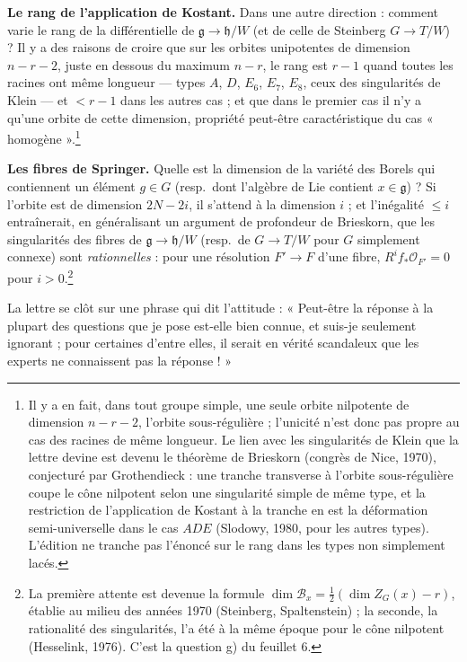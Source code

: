 \documentclass[11pt,a4paper]{article}
\begin{document}
\textbf{Le rang de l'application de Kostant.} Dans une autre direction : comment
varie le rang de la différentielle de $\mathfrak{g}\to\mathfrak{h}/W$ (et de
celle de Steinberg $G\to T/W$) ? Il y a des raisons de croire que sur les
orbites unipotentes de dimension $n-r-2$, juste en dessous du maximum $n-r$, le
rang est $r-1$ quand toutes les racines ont même longueur — types $A$, $D$,
$E_{6}$, $E_{7}$, $E_{8}$, ceux des singularités de Klein — et $<r-1$ dans les
autres cas ; et que dans le premier cas il n'y a qu'une orbite de cette
dimension, propriété peut-être caractéristique du cas « homogène ».\footnote{Il
y a en fait, dans tout groupe simple, une seule orbite nilpotente de dimension
$n-r-2$, l'orbite sous-régulière ; l'unicité n'est donc pas propre au cas des
racines de même longueur. Le lien avec les singularités de Klein que la lettre
devine est devenu le théorème de Brieskorn (congrès de Nice, 1970), conjecturé
par Grothendieck : une tranche transverse à l'orbite sous-régulière coupe le
cône nilpotent selon une singularité simple de même type, et la restriction de
l'application de Kostant à la tranche en est la déformation semi-universelle
dans le cas $ADE$ (Slodowy, 1980, pour les autres types). L'édition ne tranche
pas l'énoncé sur le rang dans les types non simplement lacés.}

\textbf{Les fibres de Springer.} Quelle est la dimension de la variété des
Borels qui contiennent un élément $g\in G$ (resp.\ dont l'algèbre de Lie
contient $x\in\mathfrak{g}$) ? Si l'orbite est de dimension $2N-2i$, il
s'attend à la dimension $i$ ; et l'inégalité $\leqslant i$ entraînerait, en
généralisant un argument de profondeur de Brieskorn, que les singularités des
fibres de $\mathfrak{g}\to\mathfrak{h}/W$ (resp.\ de $G\to T/W$ pour $G$
simplement connexe) sont \emph{rationnelles} : pour une résolution $F'\to F$
d'une fibre, $R^{i}f_{*}\mathcal{O}_{F'}=0$ pour $i>0$.\footnote{La première
attente est devenue la formule $\dim\mathcal{B}_{x}=\frac12(\dim
Z_{G}(x)-r)$, établie au milieu des années 1970 (Steinberg, Spaltenstein) ;
la seconde, la rationalité des singularités, l'a été à la même époque pour le
cône nilpotent (Hesselink, 1976). C'est la question g) du feuillet 6.}

La lettre se clôt sur une phrase qui dit l'attitude : « Peut-être la réponse à
la plupart des questions que je pose est-elle bien connue, et suis-je seulement
ignorant ; pour certaines d'entre elles, il serait en vérité scandaleux que les
experts ne connaissent pas la réponse ! »
\end{document}
